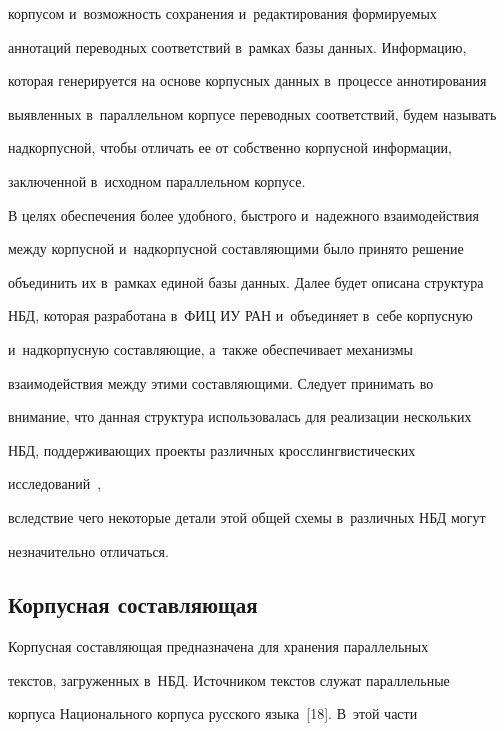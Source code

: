 корпусом и~воз\-мож\-ность со\-хра\-не\-ния и~редактирования фор\-ми\-ру\-емых 


аннотаций переводных соответствий в~рамках базы данных. Информацию, 


которая генерируется на основе корпусных данных в~процессе аннотирования 


выявленных в~параллельном корпусе переводных соответствий, будем называть 


надкорпусной, чтобы отличать ее от собственно корпусной информации, 


за\-клю\-чен\-ной в~исходном параллельном корпусе.


   


   В целях обеспечения более удобного, быстрого и~надежного взаимодействия 


между корпусной и~надкорпусной составляющими было принято решение 


объединить их в~рамках единой базы данных. Далее будет описана структура 


НБД, которая разработана в~ФИЦ ИУ РАН и~объединяет в~себе корпусную 


и~надкорпусную со\-став\-ля\-ющие, а~так\-же обеспечивает механизмы 


взаимодействия между этими со\-став\-ля\-ющи\-ми. Следует принимать во 


внимание, что данная структура использовалась для реализации нескольких 


НБД, поддерживающих проекты различных кросслингвистических 


исследований~\cite{6-k, 7-k, 8-k, 9-k, 10-k, 11-k, 12-k, 13-k, 14-k, 15-k, 16-k}, 


вследствие чего некоторые детали этой общей схемы в~различных НБД могут 


незначительно отличаться.


   


\subsection{Корпусная составляющая}





   Корпусная составляющая предназначена для хранения параллельных 


текс\-тов, загруженных в~НБД. Источником текс\-тов служат параллельные 


корпуса Национального корпуса русского языка~[18]. В~этой час\-ти 


